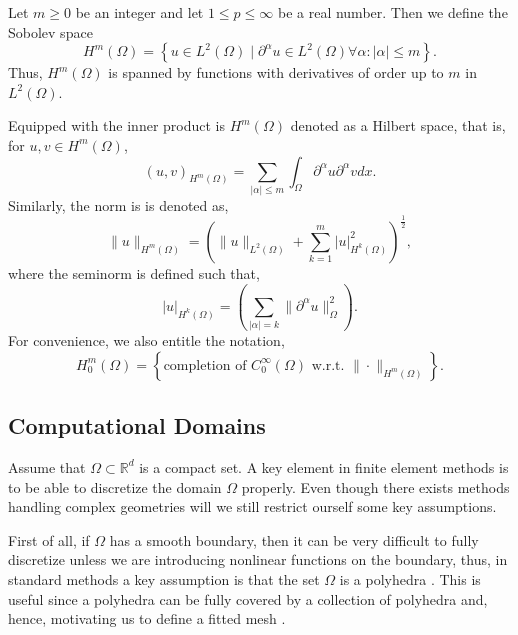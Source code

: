 \begin{definition}
    \label{def:sobolev_spaces}
    Let $m\ge 0$ be an integer and let $1 \le  p \le  \infty$ be a real number. Then we define the Sobolev space
\[
H^{m}\left( \Omega  \right) = \left\{ u \in L^{2}\left( \Omega  \right)  \mid  \partial ^{\alpha } u \in L^{2}\left( \Omega  \right)  \forall \alpha : \left\lvert \alpha  \right\rvert  \le m \right\}.
\]
Thus, $H^{m}( \Omega ) $ is spanned by functions with derivatives of order up to $m$ in $L^{2}( \Omega ) $.
\end{definition}
Equipped with the inner product is $H^{m}\left( \Omega  \right) $  denoted as a Hilbert space, that is, for $u,v \in H^{m}\left( \Omega  \right) $, \[
    \left( u,v \right) _{H^{m}\left( \Omega   \right) } = \sum_{\left\lvert \alpha  \right\rvert  \le  m}^{}  \int_{\Omega }^{} \partial ^{\alpha } u \partial ^{\alpha } v dx.
\]
Similarly, the norm is is denoted as, \[
\| u \|_{ H^{m}\left( \Omega  \right)  }^{  }  = \left( \| u \|_{ L^{2}\left( \Omega  \right)    } + \sum_{k = 1}^{m}  \left\lvert u \right\rvert ^{2} _{  H^{k}\left( \Omega  \right) }\right) ^{\frac{1}{2}},
\]
where the seminorm is defined such that, \[
\left\lvert u \right\rvert _{H^{k}\left( \Omega  \right) } = \left( \sum_{\left\lvert \alpha  \right\rvert  = k}^{} \| \partial ^{\alpha }u \|_{ \Omega  }^{ 2 }  \right).
\]
For convenience, we also entitle the notation,
\[
H^{m}_{0} \left( \Omega  \right) = \left\{ \text{completion of }C_{0}^{\infty}\left( \Omega  \right) \text{ w.r.t. } \| \cdot  \|_{H^{m}\left( \Omega  \right)   }^{  }  \right\}.
\]




\subsection{Computational Domains}%
\label{sub:computational_domain}
Assume that $\Omega \subset \mathbb{R} ^{d} $ is a compact set.
A key element in finite element methods is to be able to discretize the domain $\Omega $ properly. Even though there exists methods handling complex geometries will we still restrict ourself some key assumptions.

First of all, if $\Omega $ has a smooth boundary, then it can be very difficult to fully discretize unless we are introducing nonlinear functions on the boundary, thus, in standard methods a key assumption is that the set $\Omega $ is a polyhedra \cite[Assumption
1.7]{pietro2012}. This is useful since a polyhedra can be fully covered by a collection of polyhedra and, hence, motivating us to define a fitted mesh .

